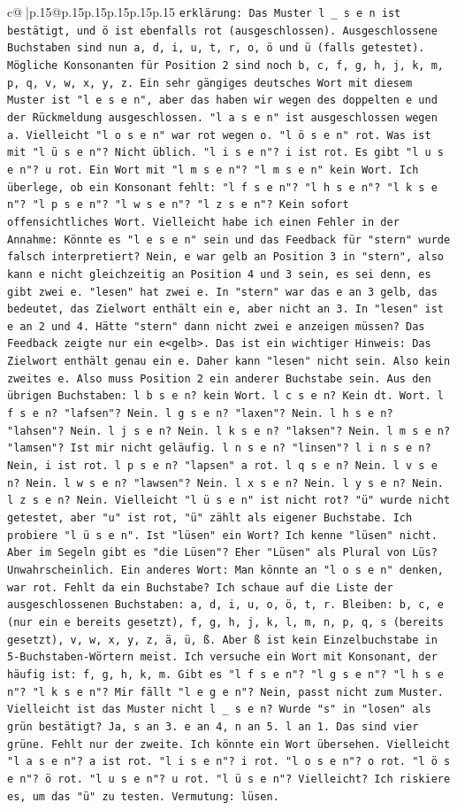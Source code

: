 \documentclass{article}
\begin{document}
{\begin{supertabular}{c@{$\;$}|p{.15\linewidth}@{}p{.15\linewidth}p{.15\linewidth}p{.15\linewidth}p{.15\linewidth}p{.15\linewidth}}
{{{                \texttt{erklärung: Das Muster l \_ s e n ist bestätigt, und ö ist ebenfalls rot (ausgeschlossen). Ausgeschlossene Buchstaben sind nun a, d, i, u, t, r, o, ö und ü (falls getestet). Mögliche Konsonanten für Position 2 sind noch b, c, f, g, h, j, k, m, p, q, v, w, x, y, z. Ein sehr gängiges deutsches Wort mit diesem Muster ist "l e s e n", aber das haben wir wegen des doppelten e und der Rückmeldung ausgeschlossen. "l a s e n" ist ausgeschlossen wegen a. Vielleicht "l o s e n" war rot wegen o. "l ö s e n" rot. Was ist mit "l ü s e n"? Nicht üblich. "l i s e n"? i ist rot. Es gibt "l u s e n"? u rot. Ein Wort mit "l m s e n"? "l m s e n" kein Wort. Ich überlege, ob ein Konsonant fehlt: "l f s e n"? "l h s e n"? "l k s e n"? "l p s e n"? "l w s e n"? "l z s e n"? Kein sofort offensichtliches Wort. Vielleicht habe ich einen Fehler in der Annahme: Könnte es "l e s e n" sein und das Feedback für "stern" wurde falsch interpretiert? Nein, e war gelb an Position 3 in "stern", also kann e nicht gleichzeitig an Position 4 und 3 sein, es sei denn, es gibt zwei e. "lesen" hat zwei e. In "stern" war das e an 3 gelb, das bedeutet, das Zielwort enthält ein e, aber nicht an 3. In "lesen" ist e an 2 und 4. Hätte "stern" dann nicht zwei e anzeigen müssen? Das Feedback zeigte nur ein e<gelb>. Das ist ein wichtiger Hinweis: Das Zielwort enthält genau ein e. Daher kann "lesen" nicht sein. Also kein zweites e. Also muss Position 2 ein anderer Buchstabe sein. Aus den übrigen Buchstaben: l b s e n? kein Wort. l c s e n? Kein dt. Wort. l f s e n? "lafsen"? Nein. l g s e n? "laxen"? Nein. l h s e n? "lahsen"? Nein. l j s e n? Nein. l k s e n? "laksen"? Nein. l m s e n? "lamsen"? Ist mir nicht geläufig. l n s e n? "linsen"? l i n s e n? Nein, i ist rot. l p s e n? "lapsen" a rot. l q s e n? Nein. l v s e n? Nein. l w s e n? "lawsen"? Nein. l x s e n? Nein. l y s e n? Nein. l z s e n? Nein. Vielleicht "l ü s e n" ist nicht rot? "ü" wurde nicht getestet, aber "u" ist rot, "ü" zählt als eigener Buchstabe. Ich probiere "l ü s e n". Ist "lüsen" ein Wort? Ich kenne "lüsen" nicht. Aber im Segeln gibt es "die Lüsen"? Eher "Lüsen" als Plural von Lüs? Unwahrscheinlich. Ein anderes Wort: Man könnte an "l o s e n" denken, war rot. Fehlt da ein Buchstabe? Ich schaue auf die Liste der ausgeschlossenen Buchstaben: a, d, i, u, o, ö, t, r. Bleiben: b, c, e (nur ein e bereits gesetzt), f, g, h, j, k, l, m, n, p, q, s (bereits gesetzt), v, w, x, y, z, ä, ü, ß. Aber ß ist kein Einzelbuchstabe in 5{-}Buchstaben{-}Wörtern meist. Ich versuche ein Wort mit Konsonant, der häufig ist: f, g, h, k, m. Gibt es "l f s e n"? "l g s e n"? "l h s e n"? "l k s e n"? Mir fällt "l e g e n"? Nein, passt nicht zum Muster. Vielleicht ist das Muster nicht l \_ s e n? Wurde "s" in "losen" als grün bestätigt? Ja, s an 3. e an 4, n an 5. l an 1. Das sind vier grüne. Fehlt nur der zweite. Ich könnte ein Wort übersehen. Vielleicht "l a s e n"? a ist rot. "l i s e n"? i rot. "l o s e n"? o rot. "l ö s e n"? ö rot. "l u s e n"? u rot. "l ü s e n"? Vielleicht? Ich riskiere es, um das "ü" zu testen. Vermutung: lüsen.} \\
}}}
\end{supertabular}}
\end{document}
